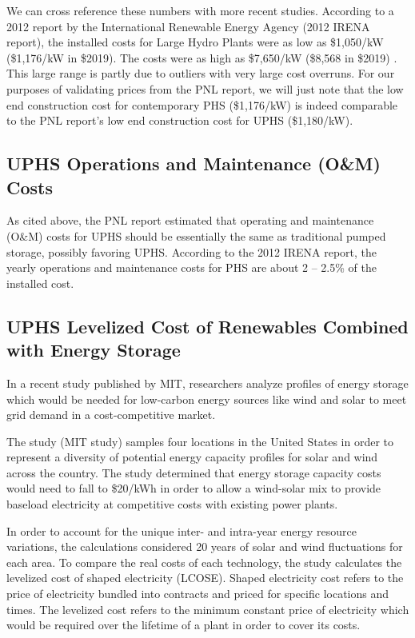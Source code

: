 \documentclass[hidelinks,12pt,a4paper]{article}
\begin{document}
We can cross reference these numbers with more recent studies. According to a 2012 report by the International Renewable Energy Agency (2012 IRENA report), the installed costs for Large Hydro Plants were as low as \$1,050/kW (\$1,176/kW in \$2019). The costs were as high as \$7,650/kW (\$8,568 in \$2019) \cite{RenewableEnergyTechnologiesCostAnalysisSeries}. This large range is partly due to outliers with very large cost overruns. For our purposes of validating prices from the PNL report, we will just note that the low end construction cost for contemporary PHS (\$1,176/kW) is indeed comparable to the PNL report's low end construction cost for UPHS (\$1,180/kW).

\subsection{UPHS Operations and Maintenance (O\&M) Costs}
As cited above, the PNL report estimated that operating and maintenance (O\&M) costs for UPHS should be essentially the same as traditional pumped storage, possibly favoring UPHS. \cite{UndergroundPumpedHydroelectricStorage} According to the 2012 IRENA report, the yearly operations and maintenance costs for PHS are about 2 – 2.5\% of the installed cost.

\subsection{UPHS Levelized Cost of Renewables Combined with Energy Storage}
In a recent study published by MIT, researchers analyze profiles of energy storage which would be needed for low-carbon energy sources like wind and solar to meet grid demand in a cost-competitive market.

The study (MIT study) samples four locations in the United States in order to represent a diversity of potential energy capacity profiles for solar and wind across the country. The study determined that energy storage capacity costs would need to fall to \$20/kWh in order to allow a wind-solar mix to provide baseload electricity at competitive costs with existing power plants.

In order to account for the unique inter- and intra-year energy resource variations, the calculations considered 20 years of solar and wind fluctuations for each area. To compare the real costs of each technology, the study calculates the levelized cost of shaped electricity (LCOSE). Shaped electricity cost refers to the price of electricity bundled into contracts and priced for specific locations and times. The levelized cost refers to the minimum constant price of electricity which would be required over the lifetime of a plant in order to cover its costs.
\end{document}
